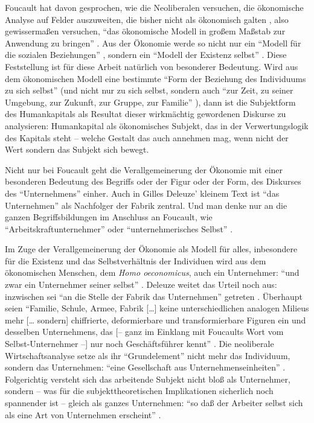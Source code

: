 \documentclass[12pt,
               DIV13,
               paper=a4,
               twoside=false,
               onehalfspacing,
               bibliography=totoc,
               toc=graduated,
               draft,
               ]{scrartcl}
\newcommand{\lips}{\dots\unkern}
\newcommand{\tit}[1]{\textit{#1}}
\newcommand{\pc}[2]{\parencite[#1]{#2}}
\newcommand{\vgl}[2]{\parencite[vgl.][#1]{#2}}
\newcommand{\worries}[1]{\ifdraft{\textcolor{blue}{\texttt{(#1)}}}{}}
\newcommand{\hoe}{\tit{Homo oeconomicus}\xspace}
\begin{document}
Foucault hat davon gesprochen, wie die Neoliberalen versuchen, die
ökonomische Analyse auf Felder auszuweiten, die bisher nicht als
ökonomisch galten \vgl{305}{gbp}, also gewissermaßen versuchen, "`das
ökonomische Modell in großem Maßstab zur Anwendung zu bringen"'
\pc{334}{gbp}. Aus der Ökonomie werde so nicht nur ein "`Modell für
die sozialen Beziehungen"' \pc{334}{gbp}, sondern ein "`Modell der
Existenz selbst"' \pc{334}{gbp}. Diese Feststellung ist für diese
Arbeit natürlich von besonderer Bedeutung. Wird aus dem ökonomischen
Modell eine bestimmte "`Form der Beziehung des Individuums zu sich
selbst"' \pc{334}{gbp} (und nicht nur zu sich selbst, sondern auch
"`zur Zeit, zu seiner Umgebung, zur Zukunft, zur Gruppe, zur Familie"'
\pc{334}{gbp}), dann ist die Subjektform des Humankapitals als Resultat
dieser wirkmächtig gewordenen Diskurse zu analysieren: Humankapital
als ökonomisches Subjekt, das in der Verwertungslogik des Kapitals
steht -- welche Gestalt das auch annehmen mag, wenn nicht der Wert
sondern das Subjekt sich bewegt.

Nicht nur bei Foucault geht die Verallgemeinerung der Ökonomie mit
einer besonderen Bedeutung des Begriffs oder der Figur oder der Form,
des Diskurses des "`Unternehmens"' einher. Auch in Gilles Deleuze'
kleinem Text  \pc{}{ps} ist "`das Unternehmen"' als
Nachfolger der Fabrik zentral. Und man denke nur an die ganzen
Begriffsbildungen im Anschluss an Foucault, wie
"`Arbeitskraftunternehmer"' oder "`unternehmerisches Selbst"'
\worries{?}.

Im Zuge der Verallgemeinerung der Ökonomie als Modell für alles,
inbesondere für die Existenz und das Selbstverhältnis der Individuen
wird aus dem ökonomischen Menschen, dem \hoe, auch ein Unternehmer:
"`und zwar ein Unternehmer seiner selbst"' \pc{314}{gbp}. Deleuze
weitet das Urteil noch aus: inzwischen sei "`an die Stelle der Fabrik
das Unternehmen"' getreten \pc{256}{ps}. Überhaupt seien "`Familie,
Schule, Armee, Fabrik [\lips] keine unterschiedlichen analogen
Milieus mehr [\lips{} sondern] chiffrierte, deformierbare und
transformierbare Figuren ein und desselben Unternehmens, das [-- ganz
im Einklang mit Foucaults Wort vom Selbst-Unternehmer --] nur noch
Geschäftsführer kennt"' \pc{260}{ps}. Die neoliberale
Wirtschaftsanalyse setze als ihr "`Grundelement"' \pc{313}{gbp} nicht
mehr das Individuum, sondern das Unternehmen: "`eine Gesellschaft aus
Unternehmenseinheiten"' \pc{313}{gbp}. Folgerichtig versteht sich das
arbeitende Subjekt nicht bloß als Unternehmer, sondern -- was für die
subjekttheoretischen Implikationen sicherlich noch spannender ist --
gleich als ganzes Unternehmen: "`so daß der Arbeiter selbst sich als
eine Art von Unternehmen erscheint"' \pc{313}{gbp}.
\end{document}

